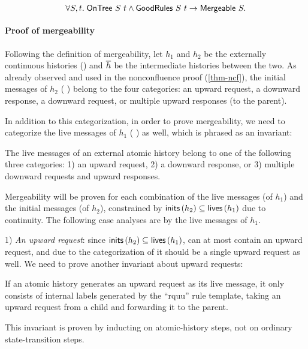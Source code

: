 \begin{theorem}
  \begin{displaymath}
    \forall S, t.\; \mathsf{OnTree}\ S\ t \land \mathsf{GoodRules}\ S\ t \to \mathsf{Mergeable}\ S.
  \end{displaymath}
  \vspace{-15pt}
  \label{thm-mgb}
\end{theorem}

\paragraph{Proof of mergeability}
Following the definition of mergeability, let $h_1$ and $h_2$ be the externally continuous histories () and $\overline{h}$ be the intermediate histories between the two.
As already observed and used in the nonconfluence proof (\autoref{thm-ncf}), the initial messages of $h_2$ (\ie{} ) belong to the four categories: an upward request, a downward response, a downward request, or multiple upward responses (to the parent).

In addition to this categorization, in order to prove mergeability, we need to categorize the live messages of $h_1$ (\ie{} ) as well, which is phrased as an invariant:
\begin{invariant}\label{inv-live-msgs}
  The live messages of an external atomic history belong to one of the following three categories: 1) an upward request, 2) a downward response, or 3) multiple downward requests and upward responses.
\end{invariant}

Mergeability will be proven for each combination of the live messages (of $h_1$) and the initial messages (of $h_2$), constrained by $\mathsf{inits}\,(h_2) \subseteq \mathsf{lives}\,(h_1)$ due to continuity.
The following case analyses are by the live messages of $h_1$.

1) \emph{An upward request}: since $\mathsf{inits}\,(h_2) \subseteq \mathsf{lives}\,(h_1)$,  can at most contain an upward request, and due to the categorization of  it should be a single upward request as well.
We need to prove another invariant about upward requests:
\begin{invariant}\label{inv-upward-rqs}
  If an atomic history generates an upward request as its live message, it only consists of internal labels generated by the ``rquu'' rule template, \ie{} taking an upward request from a child and forwarding it to the parent.
\end{invariant}
This invariant is proven by inducting on atomic-history steps, not on ordinary state-transition steps.

